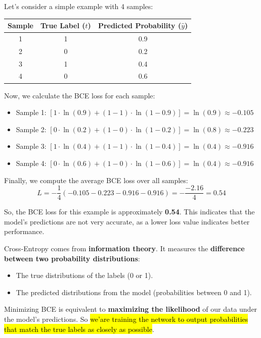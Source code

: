 \begin{deepeningbox}
    \highspace
    \begin{examplebox}
        Let's consider a simple example with 4 samples:

        \begin{center}
            \begin{tabular}{@{} c c c @{}}
                \toprule
                \textbf{Sample} & \textbf{True Label ($t$)} & \textbf{Predicted Probability ($\hat{y}$)} \\
                \midrule
                1 & 1 & 0.9 \\
                2 & 0 & 0.2 \\
                3 & 1 & 0.4 \\
                4 & 0 & 0.6 \\
                \bottomrule
            \end{tabular}
        \end{center}

        Now, we calculate the BCE loss for each sample:

        \begin{itemize}
            \item Sample 1: $\left[1 \cdot \ln(0.9) + (1 - 1) \cdot \ln(1 - 0.9)\right] = \ln(0.9) \approx -0.105$
            \item Sample 2: $\left[0 \cdot \ln(0.2) + (1 - 0) \cdot \ln(1 - 0.2)\right] = \ln(0.8) \approx -0.223$
            \item Sample 3: $\left[1 \cdot \ln(0.4) + (1 - 1) \cdot \ln(1 - 0.4)\right] = \ln(0.4) \approx -0.916$
            \item Sample 4: $\left[0 \cdot \ln(0.6) + (1 - 0) \cdot \ln(1 - 0.6)\right] = \ln(0.4) \approx -0.916$
        \end{itemize}

        Finally, we compute the average BCE loss over all samples:
        \begin{equation*}
            L = -\dfrac{1}{4} (-0.105 - 0.223 - 0.916 - 0.916) = -\dfrac{-2.16}{4} = 0.54
        \end{equation*}

        So, the BCE loss for this example is approximately \textbf{0.54}. This indicates that the model's predictions are not very accurate, as a lower loss value indicates better performance.
    \end{examplebox}

    \highspace
    Cross-Entropy comes from \textbf{information theory}. It measures the \textbf{difference between two probability distributions}:
    \begin{itemize}
        \item The true distributions of the labels (0 or 1).
        \item The predicted distributions from the model (probabilities between 0 and 1).
    \end{itemize}
    Minimizing BCE is equivalent to \textbf{maximizing the likelihood} of our data under the model's predictions. So \hl{we'are training the network to output probabilities that match the true labels as closely as possible}.


\end{deepeningbox}
